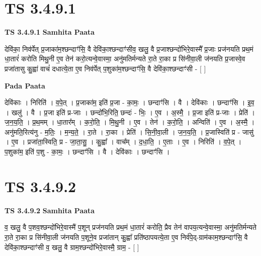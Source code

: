 \documentclass[17pt]{extarticle}
\begin{document}

\section{ TS 3.4.9.1 }

\textbf{TS 3.4.9.1 } \newline
\textbf{Samhita Paata} \newline

देवि॑का॒ निव॑र्पेत् प्र॒जाका॑म॒श्छन्दाꣳ॑सि॒ वै देवि॑का॒श्छन्दाꣳ॑सीव॒ खलु॒ वै प्र॒जाश्छन्दो॑भिरे॒वास्मै᳚ प्र॒जाः प्रज॑नयति प्रथ॒मं धा॒तारं॑ करोति मिथु॒नी ए॒व तेन॑ करो॒त्यन्वे॒वास्मा॒ अनु॑मतिर्मन्यते रा॒ते रा॒का प्र सि॑नीवा॒ली ज॑नयति प्र॒जास्वे॒व प्रजा॑तासु कु॒ह्वा॑ वाचं॑ दधात्ये॒ता ए॒व निव॑र्पेत् प॒शुका॑म॒श्छन्दाꣳ॑सि॒ वै देवि॑का॒श्छन्दाꣳ॑सी - [  ] \newline

\textbf{Pada Paata} \newline

देवि॑काः । निरिति॑ । व॒पे॒त् । प्र॒जाका॑म॒ इति॑ प्र॒जा - का॒मः॒ । छन्दाꣳ॑सि । वै । देवि॑काः । छन्दाꣳ॑सि । इ॒व॒ । खलु॑ । वै । प्र॒जा इति॑ प्र-जाः । छन्दो॑भि॒रिति॒ छन्दः॑ - भिः॒ । ए॒व । अ॒स्मै॒ । प्र॒जा इति॑ प्र-जाः । प्रेति॑ । ज॒न॒य॒ति॒ । प्र॒थ॒मम् । धा॒तार᳚म् । क॒रो॒ति॒ । मि॒थु॒नी । ए॒व । तेन॑ । क॒रो॒ति॒ । अन्विति॑ । ए॒व । अ॒स्मै॒ । अनु॑मति॒रित्य॑नु - म॒तिः॒ । म॒न्य॒ते॒ । रा॒ते । रा॒का । प्रेति॑ । सि॒नी॒वा॒ली । ज॒न॒य॒ति॒ । प्र॒जास्विति॑ प्र - जासु॑ । ए॒व । प्रजा॑ता॒स्विति॒ प्र - जा॒ता॒सु॒ । कु॒ह्वा᳚ । वाच᳚म् । द॒धा॒ति॒ । ए॒ताः । ए॒व । निरिति॑ । व॒पे॒त् । प॒शुका॑म॒ इति॑ प॒शु - का॒मः॒ । छन्दाꣳ॑सि । वै । देवि॑काः । छन्दाꣳ॑सि ।  \newline





\section{ TS 3.4.9.2 }

\textbf{TS 3.4.9.2 } \newline
\textbf{Samhita Paata} \newline

व॒ खलु॒ वै प॒शव॒श्छन्दो॑भिरे॒वास्मै॑ प॒शून् प्रज॑नयति प्रथ॒मं धा॒तारं॑ करोति॒ प्रैव तेन॑ वापय॒त्यन्वे॒वास्मा॒ अनु॑मतिर्मन्यते रा॒ते रा॒का प्र सि॑नीवा॒ली ज॑नयति प॒शूने॒व प्रजा॑तान् कु॒ह्वा᳚ प्रति॑ष्ठापयत्ये॒ता ए॒व निर्व॑पे॒द्-ग्राम॑काम॒श्छन्दाꣳ॑सि॒ वै देवि॑का॒श्छन्दाꣳ॑सी व॒ खलु॒ वै ग्राम॒श्छन्दो॑भिरे॒वास्मै॒ ग्राम॒ - [  ] \newline
\end{document}
